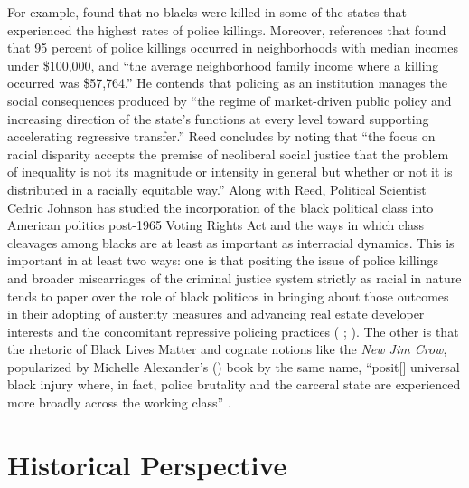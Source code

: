 \documentclass[12pt]{article}
\begin{document}
For example, \textcite{reedHowRacialDisparity2016} found that no blacks were killed in some of the states that experienced the highest rates of police killings. Moreover, \textcite{reedHowRacialDisparity2016} references that \parencite{jilani95PoliceKillings2015} found that 95 percent of police killings occurred in neighborhoods with median incomes under \$100,000, and “the average neighborhood family income where a killing occurred was \$57,764.” He contends that policing as an institution manages the social consequences produced by “the regime of market-driven public policy and increasing direction of the state’s functions at every level toward supporting accelerating regressive transfer.” Reed concludes by noting that “the focus on racial disparity accepts the premise of neoliberal social justice that the problem of inequality is not its magnitude or intensity in general but whether or not it is distributed in a racially equitable way.” Along with Reed, Political Scientist Cedric Johnson has studied the incorporation of the black political class into American politics post-1965 Voting Rights Act and the ways in which class cleavages among blacks are at least as important as interracial dynamics. This is important in at least two ways: one is that positing the issue of police killings and broader miscarriages of the criminal justice system strictly as racial in nature tends to paper over the role of black politicos in bringing about those outcomes in their adopting of austerity measures and advancing real estate developer interests and the concomitant repressive policing practices (\citeauthor{johnsonAfterwordBaltimorePolicing2016} \citeyear[305]{johnsonAfterwordBaltimorePolicing2016}; \citeyear[179]{johnsonTrumpismPolicingProblem2019}). The other is that the rhetoric of Black Lives Matter and cognate notions like the \textit{New Jim Crow}, popularized by Michelle Alexander’s (\citeyear{alexanderNewJimCrow2010}) book by the same name, “posit[] universal black injury where, in fact, police brutality and the carceral state are experienced more broadly across the working class” \parencite*[317]{johnsonAfterwordBaltimorePolicing2016}.

\section{Historical Perspective}\
\end{document}
